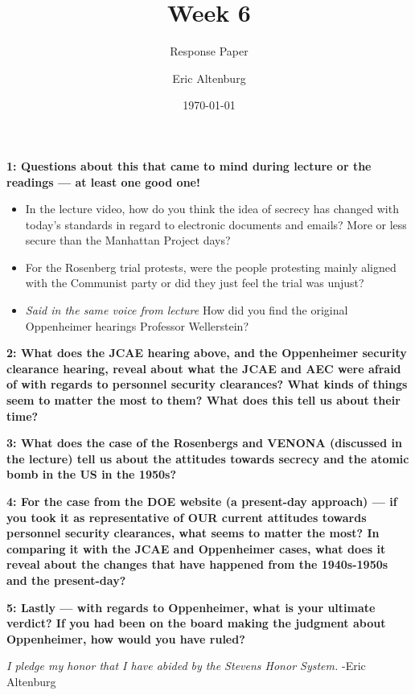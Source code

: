 \documentclass[12pt]{turabian-researchpaper}
\title{Week 6}
\subtitle{Response Paper}
\author{Eric Altenburg}
\date{\today}
\newcommand\question[2]{\noindent\textbf{#1: #2}}
\begin{document}
	\maketitle

	\question{1}{Questions about this that came to mind during lecture or the readings — at least one good one!}

		\begin{itemize}
			\item In the lecture video, how do you think the idea of secrecy has changed with today's standards in regard to electronic documents and emails? More or less secure than the Manhattan Project days?
			\item For the Rosenberg trial protests, were the people protesting mainly aligned with the Communist party or did they just feel the trial was unjust?
			\item \textit{Said in the same voice from lecture} \newline
				How did you find the original Oppenheimer hearings Professor Wellerstein?
		\end{itemize}

	\question{2}{What does the JCAE hearing above, and the Oppenheimer security clearance hearing, reveal about what the JCAE and AEC were afraid of with regards to personnel security clearances? What kinds of things seem to matter the most to them? What does this tell us about their time?}


	\question{3}{What does the case of the Rosenbergs and VENONA (discussed in the lecture) tell us about the attitudes towards secrecy and the atomic bomb in the US in the 1950s?}


	\question{4}{For the case from the DOE website (a present-day approach) — if you took it as representative of OUR current attitudes towards personnel security clearances, what seems to matter the most? In comparing it with the JCAE and Oppenheimer cases, what does it reveal about the changes that have happened from the 1940s-1950s and the present-day?}


	\question{5}{Lastly — with regards to Oppenheimer, what is your ultimate verdict? If you had been on the board making the judgment about Oppenheimer, how would you have ruled?}

\vspace*{\fill}
\noindent\textit{I pledge my honor that I have abided by the Stevens Honor System.} -Eric Altenburg
\end{document}
